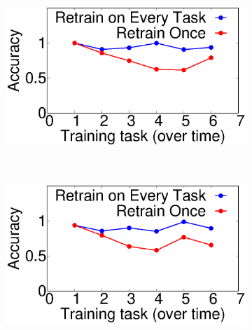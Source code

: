 \begin{figure}[t]
  \centering
\begin{subfigure}[t]{0.5\linewidth}
    \centering
    \includegraphics[width=\linewidth]{figures/motivation/Class_Incrementality/new_class_acc.eps}
  \end{subfigure}
  ~~
  \begin{subfigure}[t]{0.5\linewidth}
    \centering
    \includegraphics[width=\linewidth]{figures/motivation/Class_Incrementality/class_dist_change_acc.eps}
    \label{fig:class-distrib-motivation-acc}
  \end{subfigure}

\end{figure}
